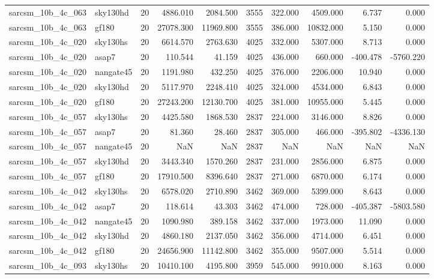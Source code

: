 \documentclass{article}
\begin{document}
\begin{longtable}{llrrrrrrrr}
sarcsm\_10b\_4c\_063 & sky130hd & 20 & 4886.010 & 2084.500 & 3555 & 322.000 & 4509.000 & 6.737 & 0.000 \\
sarcsm\_10b\_4c\_063 & gf180 & 20 & 27078.300 & 11969.800 & 3555 & 386.000 & 10832.000 & 5.150 & 0.000 \\
sarcsm\_10b\_4c\_020 & sky130hs & 20 & 6614.570 & 2763.630 & 4025 & 332.000 & 5307.000 & 8.713 & 0.000 \\
sarcsm\_10b\_4c\_020 & asap7 & 20 & 110.544 & 41.159 & 4025 & 436.000 & 660.000 & -400.478 & -5760.220 \\
sarcsm\_10b\_4c\_020 & nangate45 & 20 & 1191.980 & 432.250 & 4025 & 376.000 & 2206.000 & 10.940 & 0.000 \\
sarcsm\_10b\_4c\_020 & sky130hd & 20 & 5117.970 & 2248.410 & 4025 & 324.000 & 4534.000 & 6.843 & 0.000 \\
sarcsm\_10b\_4c\_020 & gf180 & 20 & 27243.200 & 12130.700 & 4025 & 381.000 & 10955.000 & 5.445 & 0.000 \\
sarcsm\_10b\_4c\_057 & sky130hs & 20 & 4425.580 & 1868.530 & 2837 & 224.000 & 3146.000 & 8.826 & 0.000 \\
sarcsm\_10b\_4c\_057 & asap7 & 20 & 81.360 & 28.460 & 2837 & 305.000 & 466.000 & -395.802 & -4336.130 \\
sarcsm\_10b\_4c\_057 & nangate45 & 20 & NaN & NaN & 2837 & NaN & NaN & NaN & NaN \\
sarcsm\_10b\_4c\_057 & sky130hd & 20 & 3443.340 & 1570.260 & 2837 & 231.000 & 2856.000 & 6.875 & 0.000 \\
sarcsm\_10b\_4c\_057 & gf180 & 20 & 17910.500 & 8396.640 & 2837 & 271.000 & 6870.000 & 6.174 & 0.000 \\
sarcsm\_10b\_4c\_042 & sky130hs & 20 & 6578.020 & 2710.890 & 3462 & 369.000 & 5399.000 & 8.643 & 0.000 \\
sarcsm\_10b\_4c\_042 & asap7 & 20 & 118.614 & 43.303 & 3462 & 474.000 & 728.000 & -405.387 & -5803.580 \\
sarcsm\_10b\_4c\_042 & nangate45 & 20 & 1090.980 & 389.158 & 3462 & 337.000 & 1973.000 & 11.090 & 0.000 \\
sarcsm\_10b\_4c\_042 & sky130hd & 20 & 4860.180 & 2137.050 & 3462 & 356.000 & 4714.000 & 6.451 & 0.000 \\
sarcsm\_10b\_4c\_042 & gf180 & 20 & 24656.900 & 11142.800 & 3462 & 355.000 & 9507.000 & 5.514 & 0.000 \\
sarcsm\_10b\_4c\_093 & sky130hs & 20 & 10410.100 & 4195.800 & 3959 & 545.000 & 9910.000 & 8.163 & 0.000 \\

\end{longtable}
\end{document}
